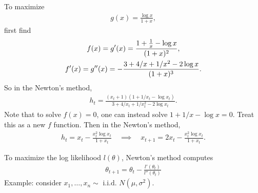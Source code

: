   \begin{frame}
    To maximize
    \begin{align*}
      g(x) = \frac{\log x}{1+x},
    \end{align*}
    first find
    \begin{gather*}
      f(x) = g'(x)=\frac{1+\frac{1}{x} - \log x}{(1+x)^2}, \\
      f'(x) = g''(x) = - \frac{3+4/x+1/x^2 - 2\log x}{(1+x)^3}.
    \end{gather*}
    So in the Newton's method,
    \begin{align*}
      h_t = \frac{(x_t + 1)(1+1/x_t - \log x_t)}{
        3+4/x_t+1/x_t^2 - 2\log x_t
      }.
    \end{align*}
    Note that to solve $f(x)=0$, one can instead solve $1+1/x - \log
    x=0$.  Treat this as a new $f$ function.  Then in the Newton's
    method,
    \begin{align*}
      h_t = x_t - \frac{x_t^2 \log x_t}{1+x_t}
      \quad\implies\quad
      x_{t+1} = 2x_t - \frac{x_t^2 \log x_t}{1+x_t}.
    \end{align*}
\end{frame}





 \begin{frame}[t]
    To maximize the log likelihood $l(\theta)$, Newton's method
    computes
    \begin{align*}
      \theta_{t+1} = \theta_t - \frac{l'(\theta_t)}{l''(\theta_t)}
    \end{align*}
\noindent Example: consider $x_1,\ldots,x_n \sim\mbox{ i.i.d. } N(\mu,\sigma^2)$.\\
    \vspace{1cm}

  \end{frame}

